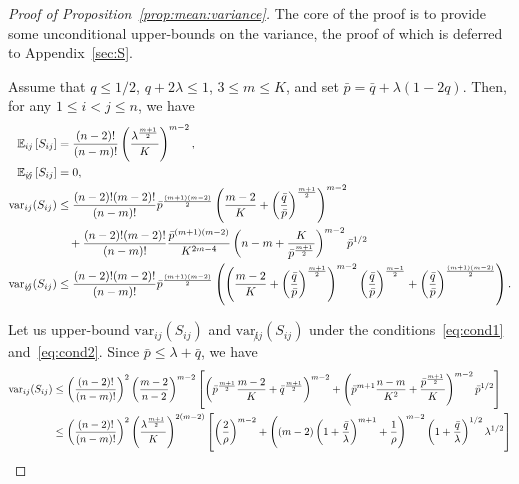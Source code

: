 \documentclass[final]{colt2026}
\newcommand{\1}{\mathbf{1}}
\newcommand{\bbE}{\mathbb{E}}
\newcommand{\pa}[1]{\left(#1\right)}
\newcommand{\cro}[1]{\left[#1\right]}
\begin{document}
\begin{proof}[Proof of Proposition~\ref{prop:mean:variance}]
The core of the proof is to provide some unconditional upper-bounds on the variance, the proof of which is deferred to Appendix~\ref{sec:S}.
\begin{lemma}\label{lem:cliques}
Assume that $q\leq 1/2$, $q+2\lambda \leq 1$, $3\leq m\leq K$, and set $\bar p=\bar q+\lambda(1-2q)$.
Then, for any $1\leq i< j\leq n$, we have 
\begin{align}
\bbE_{ij}\cro{S_{ij}}&={(n-2)!\over (n-m)!} \pa{\lambda^{m+1\over 2} \over K}^{m-2}, \label{eq:mean:12}\\
\bbE_{\not ij}\cro{S_{ij}}&= 0, \label{eq:mean:not12}\\
\mathrm{var}_{ij}(S_{ij}) & \leq {(n-2)! (m-2)!\over (n-m)!} \bar p^{(m+1)(m-2)\over 2} \pa{{m-2 \over K}+\pa{\bar q\over \bar p}^{{m+1\over 2}}}^{m-2} \nonumber\\
&\quad +{(n-2)!(m-2)!\over (n-m)!}{\bar p^{(m+1)(m-2)} \over K^{2m-4}}
\pa{n-m+{K\over \bar p^{m+1\over 2}}}^{m-2}\bar p^{1/2} \label{eq:var:12}\\
 \mathrm{var}_{\not ij}(S_{ij}) & \leq {(n-2)! (m-2)!\over (n-m)!} \bar p^{(m+1)(m-2)\over 2} \pa{\pa{{m-2 \over K}+\pa{\bar q\over \bar p}^{{m+1\over 2}}}^{m-2} \pa{\bar q\over \bar p}^{{m-1\over 2}}+ \pa{\bar q\over \bar p}^{{(m+1)(m-2)\over 2}} }.\label{eq:var:not12}
\end{align}
\end{lemma}
Let us upper-bound $\mathrm{var}_{ij}(S_{ij})$ and $\mathrm{var}_{\not ij}(S_{ij})$ under the conditions~\eqref{eq:cond1} and~\eqref{eq:cond2}. 
Since $\bar p \leq \lambda+\bar q$, we have
\begin{align*}
 \mathrm{var}_{ij}(S_{ij}) & \leq \pa{(n-2)!\over (n-m)!}^2 \pa{m-2\over n-2}^{m-2} \cro{\pa{\bar p^{m+1\over 2}{m-2\over K}+\bar q^{m+1\over 2}}^{m-2}+
 \pa{\bar p^{m+1}{n-m\over K^2}+{\bar p^{m+1\over 2}\over K}}^{m-2}\bar p^{1/2}}\\
 &\leq  \pa{(n-2)!\over (n-m)!}^2  \pa{\lambda^{m+1\over 2} \over K}^{2(m-2)}\cro{\pa{2\over \rho}^{m-2}+\pa{(m-2)\pa{1+{\bar q\over \lambda}}^{m+1}+{1\over \rho}}^{m-2}\pa{1+{\bar q\over \lambda}}^{1/2}\lambda^{1/2}}\\

\end{align*}
\end{proof}
\end{document}
